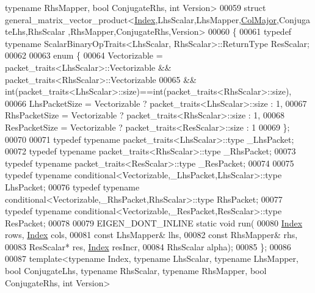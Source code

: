 \begin{DoxyCode}
{      typename} RhsMapper, \textcolor{keywordtype}{bool} ConjugateRhs, \textcolor{keywordtype}{int} Version>
00059 \textcolor{keyword}{struct }general\_matrix\_vector\_product<\hyperlink{namespace_eigen_a62e77e0933482dafde8fe197d9a2cfde}{Index},LhsScalar,LhsMapper,\hyperlink{group__enums_ggaacded1a18ae58b0f554751f6cdf9eb13a0cbd4bdd0abcfc0224c5fcb5e4f6669a}{ColMajor},ConjugateLhs,RhsScalar
      ,RhsMapper,ConjugateRhs,Version>
00060 \{
00061   \textcolor{keyword}{typedef} \textcolor{keyword}{typename} ScalarBinaryOpTraits<LhsScalar, RhsScalar>::ReturnType ResScalar;
00062 
00063 \textcolor{keyword}{enum} \{
00064   Vectorizable = packet\_traits<LhsScalar>::Vectorizable && packet\_traits<RhsScalar>::Vectorizable
00065               && int(packet\_traits<LhsScalar>::size)==int(packet\_traits<RhsScalar>::size),
00066   LhsPacketSize = Vectorizable ? packet\_traits<LhsScalar>::size : 1,
00067   RhsPacketSize = Vectorizable ? packet\_traits<RhsScalar>::size : 1,
00068   ResPacketSize = Vectorizable ? packet\_traits<ResScalar>::size : 1
00069 \};
00070 
00071 \textcolor{keyword}{typedef} \textcolor{keyword}{typename} packet\_traits<LhsScalar>::type  \_LhsPacket;
00072 \textcolor{keyword}{typedef} \textcolor{keyword}{typename} packet\_traits<RhsScalar>::type  \_RhsPacket;
00073 \textcolor{keyword}{typedef} \textcolor{keyword}{typename} packet\_traits<ResScalar>::type  \_ResPacket;
00074 
00075 \textcolor{keyword}{typedef} \textcolor{keyword}{typename} conditional<Vectorizable,\_LhsPacket,LhsScalar>::type LhsPacket;
00076 \textcolor{keyword}{typedef} \textcolor{keyword}{typename} conditional<Vectorizable,\_RhsPacket,RhsScalar>::type RhsPacket;
00077 \textcolor{keyword}{typedef} \textcolor{keyword}{typename} conditional<Vectorizable,\_ResPacket,ResScalar>::type ResPacket;
00078 
00079 EIGEN\_DONT\_INLINE \textcolor{keyword}{static} \textcolor{keywordtype}{void} run(
00080   \hyperlink{namespace_eigen_a62e77e0933482dafde8fe197d9a2cfde}{Index} rows, \hyperlink{namespace_eigen_a62e77e0933482dafde8fe197d9a2cfde}{Index} cols,
00081   \textcolor{keyword}{const} LhsMapper& lhs,
00082   \textcolor{keyword}{const} RhsMapper& rhs,
00083         ResScalar* res, \hyperlink{namespace_eigen_a62e77e0933482dafde8fe197d9a2cfde}{Index} resIncr,
00084   RhsScalar alpha);
00085 \};
00086 
00087 \textcolor{keyword}{template}<\textcolor{keyword}{typename} Index, \textcolor{keyword}{typename} LhsScalar, \textcolor{keyword}{typename} LhsMapper, \textcolor{keywordtype}{bool} ConjugateLhs, \textcolor{keyword}{typename} RhsScalar, \textcolor{keyword}{
      typename} RhsMapper, \textcolor{keywordtype}{bool} ConjugateRhs, \textcolor{keywordtype}{int} Version>

\end{DoxyCode}
